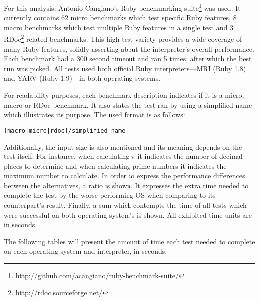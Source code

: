 For this analysis, Antonio Cangiano's Ruby benchmarking suite\footnote{\url{http://github.com/acangiano/ruby-benchmark-suite/}} was used. It currently contains 62 micro benchmarks which test specific Ruby features, 8 macro benchmarks which test multiple Ruby features in a single test and 3 RDoc\footnote{\url{http://rdoc.sourceforge.net/}}-related benchmarks. This high test variety provides a wide coverage of many Ruby features, solidly asserting about the interpreter's overall performance. Each benchmark had a 300 second timeout and ran 5 times, after which the best run was picked. All tests used both official Ruby interpreters---MRI (Ruby 1.8) and YARV (Ruby 1.9)---in both operating systems.

For readability purposes, each benchmark description indicates if it is a micro, macro or RDoc benchmark. It also states the test ran by using a simplified name which illustrates its purpose. The used format is as follows:
\begin{verbatim}
[macro|micro|rdoc]/simplified_name
\end{verbatim}
Additionally, the input size is also mentioned and its meaning depends on the test itself. For instance, when calculating $\pi$ it indicates the number of decimal places to determine and when calculating prime numbers it indicates the maximum number to calculate. In order to express the performance differences between the alternatives, a ratio is shown. It expresses the extra time needed to complete the test by the worse performing OS when comparing to its counterpart's result. Finally, a sum which contempts the time of all tests which were successful on both operating system's is shown. All exhibited time units are in seconds.

The following tables will present the amount of time each test needed to complete on each operating system and interpreter, in seconds.

